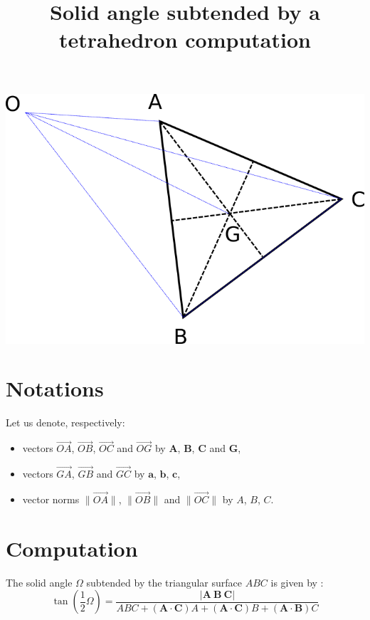 \documentclass[10pt,a4paper]{article}
\title{Solid angle subtended by a tetrahedron computation}
\newcommand{\lvec}[1]{\overrightarrow{#1}}
\newcommand{\vA}{\mathbf{A}}
\newcommand{\vB}{\mathbf{B}}
\newcommand{\vC}{\mathbf{C}}
\newcommand{\vG}{\mathbf{G}}
\newcommand{\va}{\mathbf{a}}
\newcommand{\vb}{\mathbf{b}}
\newcommand{\vc}{\mathbf{c}}
\begin{document}
\maketitle


\includegraphics[scale=0.4]{tetra.png}


\section{Notations}

Let us denote, respectively:
\begin{itemize}
  \item vectors $\lvec{OA}$, $\lvec{OB}$, $\lvec{OC}$ and $\lvec{OG}$ by $\vA$, $\vB$, $\vC$ and $\vG$,
  \item vectors $\lvec{GA}$, $\lvec{GB}$ and $\lvec{GC}$ by $\va$, $\vb$, $\vc$,
  \item vector norms $\|\lvec{OA}\|$, $\|\lvec{OB}\|$ and $\|\lvec{OC}\|$ by $A$, $B$, $C$.
\end{itemize}





\section{Computation}

The solid angle $\Omega$ subtended by the triangular surface $ABC$ is given by \cite{bib:vanOos1983solid}:
\begin{equation}
  \tan \left( {\frac {1}{2}}\Omega \right)
    = \frac{ \left| \mathbf{A \ B \ C}\right| }
           { A B C
             + ( \mathbf{A} \cdot \mathbf{C} ) A
             + ( \mathbf{A} \cdot \mathbf{C} ) B
             + ( \mathbf{A} \cdot \mathbf{B} ) C
           }
  \label{eq:refFormula}
\end{equation}
\end{document}
